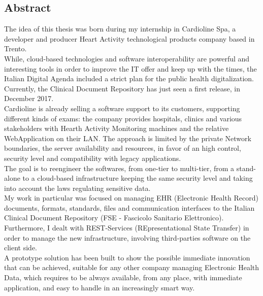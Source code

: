\thispagestyle{empty}
\begin{center}
    {\chapter*{Abstract}} %
\end{center}
\label{abstract}

The idea of this thesis was born during my internship in Cardioline Spa, a developer and producer Heart Activity technological products company based in Trento.\\While, cloud-based technologies and software interoperability are powerful and interesting tools in order to improve the IT offer and keep up with the times, the Italian Digital Agenda included a strict plan for the public health digitalization.\\Currently, the Clinical Document Repository has just seen a first release, in December 2017.\\Cardioline is already selling a software support to its customers, supporting different kinds of exams: the company provides hospitals, clinics and various stakeholders with Hearth Activity Monitoring machines and the relative WebApplication on their LAN. The approach is limited by the private Network boundaries, the server availability and resources, in favor of an high control, security level and compatibility with legacy applications.\\The goal is to reengineer the softwares, from one-tier to multi-tier, from a stand-alone to a cloud-based infrastructure keeping the same security level and taking into account the laws regulating sensitive data.\\My work in particular was focused on managing EHR (Electronic Health Record) documents, formats, standards, files and communication interfaces to the Italian Clinical Document Repository (FSE - Fascicolo Sanitario Elettronico).\\Furthermore, I dealt with REST-Services (REpresentational State Transfer) in order to manage the new infrastructure, involving third-parties software on the client side.\\A prototype solution has been built to show the possible immediate innovation that can be achieved, suitable for any other company managing Electronic Health Data, which requires to be always available, from any place, with immediate application, and easy to handle in an increasingly smart way.